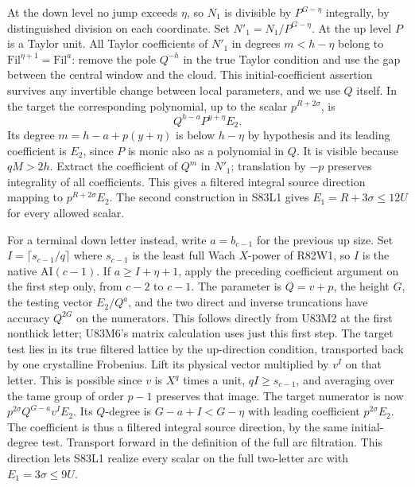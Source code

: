 At the down level no jump exceeds $\eta$, so $N_1$ is divisible by
$P^{G-\eta}$ integrally, by distinguished division on each coordinate.
Set $N'_1=N_1/P^{G-\eta}$. At the up level $P$ is a Taylor unit.
All Taylor coefficients of $N'_1$ in degrees $m<h-\eta$ belong to
$\mathrm{Fil}^{\eta+1}=\mathrm{Fil}^a$: remove the pole $Q^{-h}$
in the true Taylor condition and use the gap between the central
window and the cloud. This initial-coefficient assertion survives any
invertible change between local parameters, and we use $Q$ itself.
In the target the corresponding polynomial, up to the scalar
$p^{R+2\sigma}$, is
\[
                        Q^{h-a}P^{y+\eta} E_2 .
\]
Its degree $m=h-a+p(y+\eta)$ is below $h-\eta$ by hypothesis and
its leading coefficient is $E_2$, since $P$ is monic also as a
polynomial in $Q$. It is visible because $qM>2h$. Extract the
coefficient of $Q^m$ in $N'_1$; translation by $-p$ preserves
integrality of all coefficients. This gives a filtered integral
source direction mapping to $p^{R+2\sigma}E_2$. The second
construction in S83L1 gives $E_1=R+3\sigma\le12U$ for every
allowed scalar.

For a terminal down letter instead, write $a=b_{c-1}$ for the
previous up size. Set $I=\lceil s_{c-1}/q\rceil$ where $s_{c-1}$
is the least full Wach $X$-power of R82W1, so $I$ is the native
$\mathrm{AI}(c-1)$. If $a\ge I+\eta+1$, apply the preceding
coefficient argument on the first step only, from $c-2$ to $c-1$.
The parameter is $Q=v+p$, the height $G$, the testing vector
$E_2/Q^a$, and the two direct and inverse truncations have
accuracy $Q^{2G}$ on the numerators. This follows directly from
U83M2 at the first nonthick letter; U83M6's matrix calculation
uses just this first step. The target test lies in its true
filtered lattice by the up-direction condition, transported back
by one crystalline Frobenius. Lift its physical vector multiplied
by $v^I$ on that letter. This is possible since $v$ is $X^q$
times a unit, $qI\ge s_{c-1}$, and averaging over the tame group
of order $p-1$ preserves that image. The target numerator is now
$p^{2\sigma}Q^{G-a}v^I E_2$. Its $Q$-degree is
$G-a+I<G-\eta$ with leading coefficient $p^{2\sigma} E_2$.
The coefficient is thus a filtered integral source direction,
by the same initial-degree test. Transport forward in the definition
of the full arc filtration. This direction lets S83L1 realize every
scalar on the full two-letter arc with $E_1=3\sigma\le9U$.

